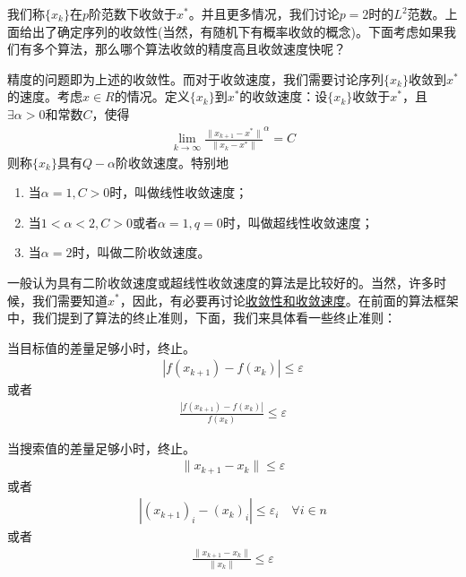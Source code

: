     我们称$\{x_k\}$在$p$阶范数下收敛于$x^*$。并且更多情况，我们讨论$p=2$时的$L^2$范数。上面给出了确定序列的收敛性(当然，有随机下有概率收敛的概念)。下面考虑如果我们有多个算法，那么哪个算法收敛的精度高且收敛速度快呢？
    \par
    精度的问题即为上述的收敛性。而对于收敛速度，我们需要讨论序列$\{x_k\}$收敛到$x^{*}$的速度。考虑$x \in R$的情况。定义$\{x_k\}$到$x^{*}$的收敛速度：设$\{x_k\}$收敛于$x^{*}$，且$\exists \alpha > 0$和常数$C$，使得
    \begin{align*}
    \mathop {\lim}\limits_{k \to \infty } \frac{\|x_{k+1}-x^{*}\|}{\|x_k-x^{*}\|}^{\alpha }=C
    \end{align*}
    则称$\{x_k\}$具有$Q - \alpha$阶收敛速度。特别地
    \begin{enumerate}
    \item 当$\alpha = 1,C>0$时，叫做线性收敛速度；
    \item 当$1<\alpha <2,C>0$或者$\alpha =1,q = 0$时，叫做超线性收敛速度；
    \item 当$\alpha = 2$时，叫做二阶收敛速度。
    \end{enumerate}
    \par
    一般认为具有二阶收敛速度或超线性收敛速度的算法是比较好的。当然，许多时候，我们需要知道$x^*$，因此，有必要再讨论\underline{收敛性和收敛速度}。在前面的算法框架中，我们提到了算法的终止准则，下面，我们来具体看一些终止准则：
    \par
    当目标值的差量足够小时，终止。
        \begin{align*}
        |f(x_{k+1})-f(x_{k})|\le \varepsilon
        \end{align*}
        或者
        \begin{align*}
        \frac {|f(x_{k+1})-f(x_{k})|}{f(x_k)}\le \varepsilon
        \end{align*}
    \par
    当搜索值的差量足够小时，终止。
        \begin{align*}
        \|x_{k+1}-x_{k}\|\le \varepsilon
        \end{align*}
        或者
        \begin{align*}
        |(x_{k+1})_i-(x_{k})_i|\le {\varepsilon}_i\quad \forall i \in n
        \end{align*}
        或者
        \begin{align*}
        \frac {\|x_{k+1}-x_{k}\|}{\|x_k\|}\le \varepsilon
        \end{align*}
    \par

